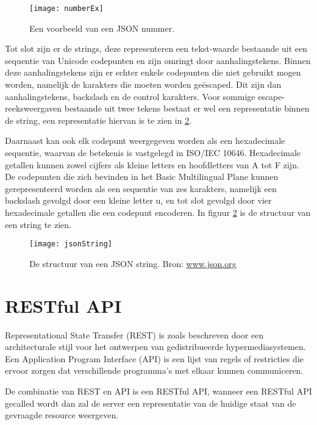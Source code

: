 \begin{figure}[H]
    \centering
    \texttt{[image: numberEx]}
    \caption[JSON Nummer]{Een voorbeeld van een JSON nummer.}
    \label{fig:numberEx}
\end{figure}

Tot slot zijn er de strings, deze representeren een tekst-waarde bestaande uit een sequentie van Unicode codepunten en zijn omringt door aanhalingstekens. Binnen deze aanhalingstekens zijn er echter enkele codepunten die niet gebruikt mogen worden, namelijk de karakters die moeten worden geëscaped. Dit zijn dan aanhalingstekens, backslash en de control karakters.
Voor sommige escape-reeksweergaven bestaande uit twee tekens bestaat er wel een representatie binnen de string, een representatie hiervan is te zien in \ref{fig:jsonString}.

Daarnaast kan ook elk codepunt weergegeven worden als een hexadecimale sequentie, waarvan de betekenis is vastgelegd in ISO/IEC 10646. Hexadecimale getallen kunnen zowel cijfers als kleine letters en hoofdletters van A tot F zijn.
De codepunten die zich bevinden in het Basic Multilingual Plane kunnen gerepresenteerd worden als een sequentie van zes karakters, namelijk een backslash gevolgd door een kleine letter u, en tot slot gevolgd door vier hexadecimale getallen die een codepunt encoderen. In figuur \ref{fig:jsonString} is de structuur van een string te zien.

\begin{figure}[H]
    \centering
    \texttt{[image: jsonString]}
    \caption[JSON String]{De structuur van een JSON string. Bron: \url{www.json.org}}
    \label{fig:jsonString}
\end{figure}


\section{RESTful API}
\label{sec:RESTful API}

Representational State Transfer (REST) is zoals beschreven door \textcite{Fielding2000} een architecturale stijl voor het ontwerpen van gedistribueerde hypermediasystemen.
Een Application Program Interface (API) is een lijst van regels of restricties die ervoor zorgen dat verschillende programma's met elkaar kunnen communiceren. \autocite{Hubspire}

De combinatie van REST en API is een RESTful API, wanneer een RESTful API gecalled wordt dan zal de server een representatie van de huidige staat van de gevraagde resource weergeven.

